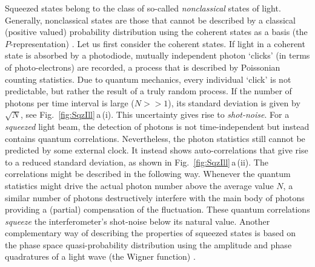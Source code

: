 


Squeezed states \cite{Yuen1976,Walls1983,Breitenbach1997,Dodonov2002} belong to the class of so-called \textit{nonclassical} states of light.
Generally, nonclassical states are those that cannot be described by a classical (positive valued) probability distribution using the coherent states as a basis (the $P$-representation) \cite{GerryKnight}. Let us first consider the coherent states. If light in a coherent state is absorbed by a photodiode, mutually independent photon `clicks' (in terms of photo-electrons) are recorded, a process that is described by Poissonian counting statistics. Due to quantum mechanics, every individual `click' is not predictable, but rather the result of a truly random process. If the number of photons per time interval is large ($N\!>\!\!>\!1$), its standard deviation is given by $\sqrt{N}$, see Fig.~\ref{fig:SqzIll}\,a\,(i). This uncertainty gives rise to \textit{shot-noise}. For a \emph{squeezed} light beam, the detection of photons is not time-independent but instead contains quantum correlations.  Nevertheless, the photon statistics still cannot be predicted by some external clock. It instead shows auto-correlations that give rise to a reduced standard deviation, as shown in Fig.~\ref{fig:SqzIll}\,a\,(ii). The correlations might be described in the following way. Whenever the quantum statistics might drive the actual photon number above the average value $N$, a similar number of photons destructively interfere with the main body of photons providing a (partial) compensation of the fluctuation. These quantum correlations \textit{squeeze} the interferometer's shot-noise below its natural value. Another complementary way of describing the properties of squeezed states is based on the phase space quasi-probability distribution using the amplitude and phase quadratures of a light wave (the Wigner function) \cite{Walls1983,GerryKnight}.

